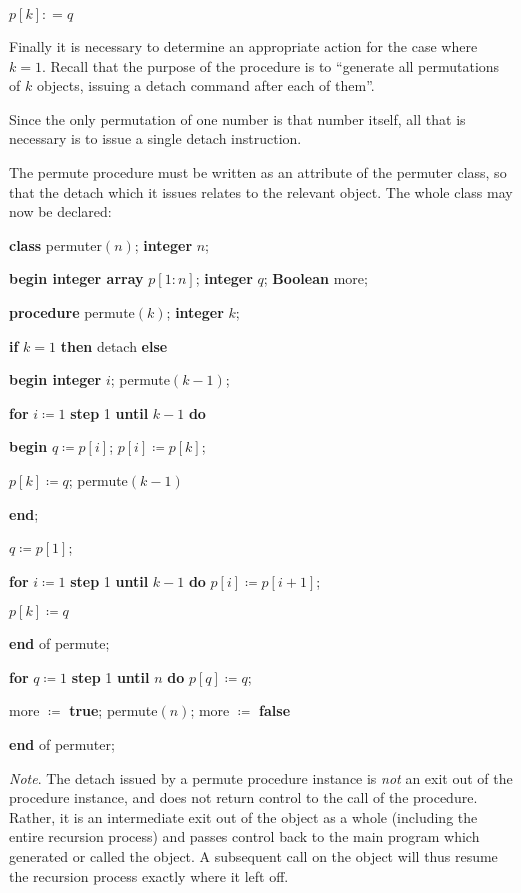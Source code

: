 \quad $p[k]: = q$

\noindent
Finally it is necessary to determine an appropriate action for the case where $k = 1$. Recall that the purpose of the procedure is to ``generate all permutations of $k$ objects, issuing a detach command after each of them''.

Since the only permutation of one number is that number itself, all that is necessary is to issue a single detach instruction.

The permute procedure must be written as an attribute of the permuter class, so that the detach which it issues relates to the relevant object. The whole class may now be declared:

\quad \textbf{class} permuter$(n)$; \textbf{integer} $n$;

\quad \textbf{begin integer array} $p[1:n]$; \textbf{integer} $q$; \textbf{Boolean} more;

\quad \quad \textbf{procedure} permute$(k)$; \textbf{integer} $k$;

\quad \quad \textbf{if} $k = 1$ \textbf{then} detach \textbf{else}

\quad \quad \textbf{begin integer} $i$; permute$(k - 1)$;

\quad \quad \quad \textbf{for} $i\coloneq 1$ \textbf{step} 1 \textbf{until} $k - 1$ \textbf{do}

\quad \quad \quad \textbf{begin} $q\coloneq p[i]$; $p[i]\coloneq p[k]$;

\quad \quad \quad \quad $p[k]\coloneq q$; permute$(k - 1)$

\quad \quad \quad \textbf{end};

\quad \quad \quad $q\coloneq p[1]$;

\quad \quad \quad \textbf{for} $i\coloneq 1$ \textbf{step} 1 \textbf{until} $k - 1$ \textbf{do} $p[i] \coloneq p[i + 1]$;

\quad \quad \quad $p[k]\coloneq q$

\quad \quad \textbf{end} of permute;

\quad \quad \textbf{for} $q\coloneq 1$ \textbf{step} 1 \textbf{until} $n$ \textbf{do} $p[q] \coloneq q$;

\quad \quad \quad more $\coloneq$ \textbf{true}; permute$(n)$; more $\coloneq$ \textbf{false}

\quad \textbf{end} of permuter;

\textit{Note}. The detach issued by a permute procedure instance is \textit{not} an exit out of the procedure instance, and does not return control to the call of the procedure. Rather, it is an intermediate exit out of the object as a whole (including the entire recursion process) and passes control back to the main program which generated or called the object. A subsequent call on the object will thus resume the recursion process exactly where it left off.

